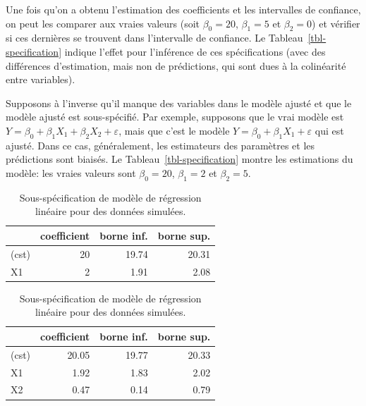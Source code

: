 \documentclass[
  11pt,
  letterpaper,
]{scrbook}
\theoremstyle{definition}
\theoremstyle{remark}
\begin{document}
Une fois qu'on a obtenu l'estimation des coefficients et les intervalles
de confiance, on peut les comparer aux vraies valeurs (soit
\(\beta_0 = 20\), \(\beta_1=5\) et \(\beta_2 = 0\)) et vérifier si ces
dernières se trouvent dans l'intervalle de confiance. Le
Tableau~\ref{tbl-specification} indique l'effet pour l'inférence de ces
spécifications (avec des différences d'estimation, mais non de
prédictions, qui sont dues à la colinéarité entre variables).

Supposons à l'inverse qu'il manque des variables dans le modèle ajusté
et que le modèle ajusté est sous-spécifié. Par exemple, supposons que le
vrai modèle est \(Y=\beta_0+\beta_1X_1+\beta_2X_2+\varepsilon\), mais
que c'est le modèle \(Y=\beta_0+\beta_1X_1+\varepsilon\) qui est ajusté.
Dans ce cas, généralement, les estimateurs des paramètres et les
prédictions sont biaisés. Le Tableau~\ref{tbl-specification} montre les
estimations du modèle: les vraies valeurs sont \(\beta_0=20\),
\(\beta_1 = 2\) et \(\beta_2 = 5\).

\begin{table}

\caption{\label{tbl-specification2}Sous-spécification de modèle de
régression linéaire pour des données
simulées.}\begin{minipage}[t]{\linewidth}

{\centering 

\centering
\begin{tabular}[t]{lrrr}
\toprule
  & coefficient & borne inf. & borne sup.\\
\midrule
(cst) & 20 & 19.74 & 20.31\\
X1 & 2 & 1.91 & 2.08\\
\bottomrule
\end{tabular}

}

\end{minipage}%
\newline
\begin{minipage}[t]{\linewidth}

{\centering 

\centering
\begin{tabular}[t]{lrrr}
\toprule
  & coefficient & borne inf. & borne sup.\\
\midrule
(cst) & 20.05 & 19.77 & 20.33\\
X1 & 1.92 & 1.83 & 2.02\\
X2 & 0.47 & 0.14 & 0.79\\
\bottomrule
\end{tabular}

}

\end{minipage}%

\end{table}
\end{document}
